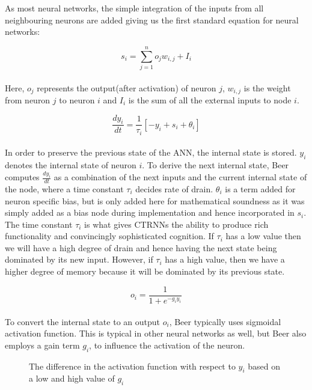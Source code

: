 As most neural networks, the simple integration of the inputs from all neighbouring neurons are added giving us the first standard equation for neural networks:

\begin{equation}
	s_i = \sum_{j=1}^{n}o_{j}w_{i,j}+I_i
\end{equation}
\\
Here, $o_j$ represents the output(after activation) of neuron $j$, $w_{i,j}$ is the weight from neuron $j$ to neuron $i$ and $I_i$ is the sum of all the external inputs to node $i$.

\begin{equation}
\frac{dy_i}{dt} = \frac{1}{\tau_i}[-y_i + s_i + \theta_i]
\end{equation}
\\
In order to preserve the previous state of the ANN, the internal state is stored. 
$y_i$ denotes the internal state of neuron $i$.
To derive the next internal state, Beer computes $\frac{dy_i}{dt}$ as a combination of the next inputs and the current internal state of the node, where a time constant $\tau_i$ decides rate of drain. 
$\theta_i$ is a term added for neuron specific bias, but is only added here for mathematical soundness as it was simply added as a bias node during implementation and hence incorporated in $s_i$.
The time constant $\tau_i$ is what gives CTRNNs the ability to produce rich functionality and convincingly sophisticated cognition.
If $\tau_i$ has a low value then we will have a high degree of drain and hence having the next state being dominated by its new input.
However, if $\tau_i$ has a high value, then we have a higher degree of memory because it will be dominated by its previous state.

\begin{equation}
o_i = \frac{1}{1 + e^{-g_{i}y_{i}}}
\end{equation}
\\
To convert the internal state to an output $o_i$, Beer typically uses sigmoidal activation function.
This is typical in other neural networks as well, but Beer also employs a gain term $g_i$, to influence the activation of the neuron.
\\
\begin{figure}[H]
	\centering
{}
	\caption{The difference in the activation function with respect to $y_i$ based on a low and high value of $g_i$}
	\label{CTRNN-gGraph}
\end{figure}

